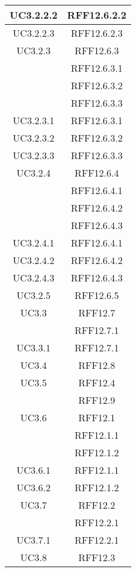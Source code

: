 \begin{longtable}{|c|c|}
\midrule
UC3.2.2.2
& RFF12.6.2.2\\

\midrule
UC3.2.2.3
& RFF12.6.2.3\\

\midrule
UC3.2.3
& RFF12.6.3\\
& RFF12.6.3.1\\
& RFF12.6.3.2\\
& RFF12.6.3.3\\

\midrule
UC3.2.3.1
& RFF12.6.3.1\\

\midrule
UC3.2.3.2
& RFF12.6.3.2\\

\midrule
UC3.2.3.3
& RFF12.6.3.3\\

\midrule
UC3.2.4
& RFF12.6.4\\
& RFF12.6.4.1\\
& RFF12.6.4.2\\
& RFF12.6.4.3\\

\midrule
UC3.2.4.1
& RFF12.6.4.1\\

\midrule
UC3.2.4.2
& RFF12.6.4.2\\

\midrule
UC3.2.4.3
& RFF12.6.4.3\\

\midrule
UC3.2.5
& RFF12.6.5\\

\midrule
UC3.3
& RFF12.7\\
& RFF12.7.1\\

\midrule
UC3.3.1
& RFF12.7.1\\

\midrule
UC3.4
& RFF12.8\\

\midrule
UC3.5
& RFF12.4\\
& RFF12.9\\

\midrule
UC3.6
& RFF12.1\\
& RFF12.1.1\\
& RFF12.1.2\\

\midrule
UC3.6.1
& RFF12.1.1\\

\midrule
UC3.6.2
& RFF12.1.2\\

\midrule
UC3.7
& RFF12.2\\
& RFF12.2.1\\

\midrule
UC3.7.1
& RFF12.2.1\\

\midrule
UC3.8
& RFF12.3\\

\end{longtable}
